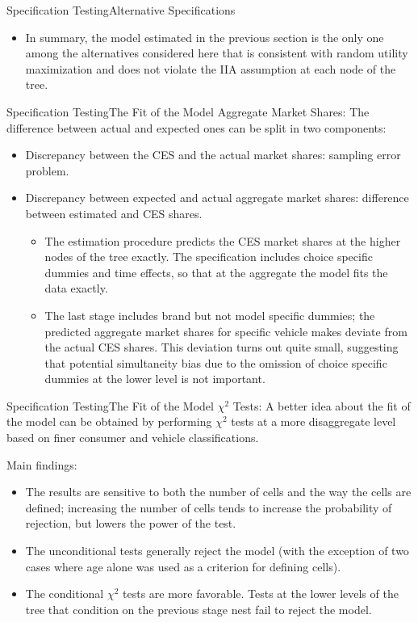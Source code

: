\documentclass{beamer}
\begin{document}
\begin{frame}{Specification Testing}{Alternative Specifications}
	\begin{itemize}
		\item In summary, the model estimated in the previous section is the only one among the alternatives considered here that is consistent with random utility maximization and does not violate the IIA assumption at each node of the tree.
	\end{itemize}
\end{frame}
\begin{frame}{Specification Testing}{The Fit of the Model}
	Aggregate Market Shares: The difference between actual and expected ones can be split in two components:
	\begin{itemize}
		\item Discrepancy between the CES and the actual market shares: sampling error problem.
		\item Discrepancy between expected and actual aggregate market shares: difference between estimated and CES shares.
		\begin{itemize}
			\item The estimation procedure predicts the CES market shares at the higher nodes of the tree exactly. The specification includes choice specific dummies and time effects, so that at the aggregate the model fits the data exactly.
			\item The last stage includes brand but not model specific dummies; the predicted aggregate market shares for specific vehicle makes deviate from the actual CES shares. This deviation turns out quite small, suggesting that potential simultaneity bias due to the omission of choice specific dummies at the lower level is not important.
		\end{itemize}
	\end{itemize}
\end{frame}
\begin{frame}{Specification Testing}{The Fit of the Model}
	$\chi^2$ Tests: A better idea about the fit of the model can be obtained by performing $\chi^2$ tests at a more disaggregate level based on finer consumer and vehicle classifications.

	Main findings:
	\begin{itemize}
		\item The results are sensitive to both the number of cells and the way the cells are defined; increasing the number of cells tends to increase the probability of rejection, but lowers the power of the test.
		\item The unconditional tests generally reject the model (with the exception of two cases where age alone was used as a criterion for defining cells).
		\item The conditional $\chi^2$ tests are more favorable. Tests at the lower levels of the tree that condition on the previous stage nest fail to reject the model.
	\end{itemize}
\end{frame}
\end{document}
